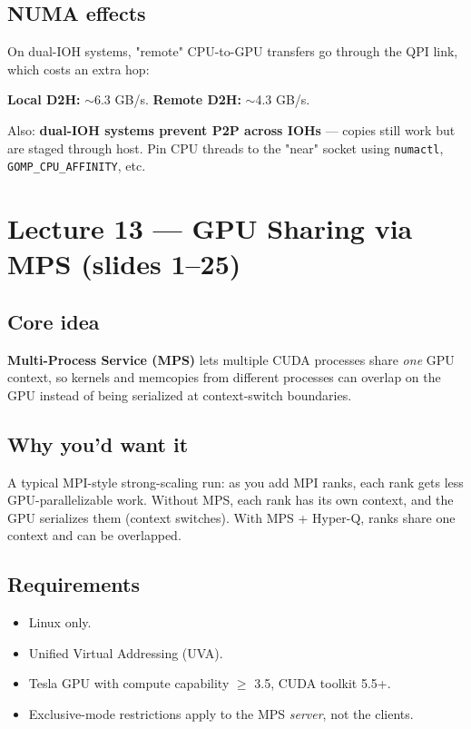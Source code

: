 \documentclass[10pt]{article}
\begin{document}
\subsection*{NUMA effects}
On dual-IOH systems, "remote" CPU-to-GPU transfers go through the QPI link, which costs an extra hop:
\begin{keybox}
\textbf{Local D2H:} $\sim$6.3 GB/s. \textbf{Remote D2H:} $\sim$4.3 GB/s.
\end{keybox}
Also: \textbf{dual-IOH systems prevent P2P across IOHs} — copies still work but are staged through host. Pin CPU threads to the "near" socket using \texttt{numactl}, \texttt{GOMP\_CPU\_AFFINITY}, etc.

\hrulefill

\section{Lecture 13 — GPU Sharing via MPS (slides 1--25)}

\subsection*{Core idea}
\textbf{Multi-Process Service (MPS)} lets multiple CUDA processes share \emph{one} GPU context, so kernels and memcopies from different processes can overlap on the GPU instead of being serialized at context-switch boundaries.

\subsection*{Why you'd want it}
A typical MPI-style strong-scaling run: as you add MPI ranks, each rank gets less GPU-parallelizable work. Without MPS, each rank has its own context, and the GPU serializes them (context switches). With MPS + Hyper-Q, ranks share one context and can be overlapped.

\subsection*{Requirements}
\begin{itemize}
  \item Linux only.
  \item Unified Virtual Addressing (UVA).
  \item Tesla GPU with compute capability $\geq$ 3.5, CUDA toolkit 5.5+.
  \item Exclusive-mode restrictions apply to the MPS \emph{server}, not the clients.
\end{itemize}
\end{document}
